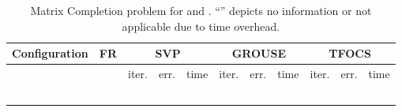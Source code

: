 \documentclass[twocolumn]{svjour3}
\begin{document}
\begin{table*}[!htp]
\caption{Matrix Completion problem for  and . ``'' depicts no information or not applicable due to time overhead.} {\label{table:2}}
\begin{center}
\begin{tabular}{|c|c|c|c|c|c|c|c|c|c|c|c|c|c|}
\multicolumn{4}{c|}{Configuration} & FR & \multicolumn{3}{|c|}{SVP} & \multicolumn{3}{|c|}{GROUSE} & \multicolumn{3}{|c}{TFOCS} \\
\hline \hline
\multicolumn{1}{c}{} & \multicolumn{1}{c}{} & \multicolumn{1}{c}{} & \multicolumn{1}{c|}{} & & 
\multicolumn{1}{|c}{\rm{iter.}} & \multicolumn{1}{c}{\rm{err.}} & \multicolumn{1}{c|}{\rm{time}} &
\multicolumn{1}{|c}{\rm{iter.}} & \multicolumn{1}{c}{\rm{err.}} & \multicolumn{1}{c|}{\rm{time}} &
\multicolumn{1}{|c}{\rm{iter.}} & \multicolumn{1}{c}{\rm{err.}} & \multicolumn{1}{c}{\rm{time}} \\
\hline\hline
\multicolumn{1}{c}{} & \multicolumn{1}{c}{} & \multicolumn{1}{c}{} & \multicolumn{1}{c|}{} &  & 
\multicolumn{1}{|c}{} & \multicolumn{1}{c}{} & \multicolumn{1}{c|}{} &
\multicolumn{1}{|c}{} & \multicolumn{1}{c}{} & \multicolumn{1}{c|}{} &
\multicolumn{1}{|c}{} & \multicolumn{1}{c}{} & \multicolumn{1}{c}{} \\
\hline
\multicolumn{1}{c}{} & \multicolumn{1}{c}{} & \multicolumn{1}{c}{} & \multicolumn{1}{c|}{} &  & 
\multicolumn{1}{|c}{} & \multicolumn{1}{c}{} & \multicolumn{1}{c|}{} &
\multicolumn{1}{|c}{} & \multicolumn{1}{c}{} & \multicolumn{1}{c|}{} &
\multicolumn{1}{|c}{} & \multicolumn{1}{c}{} & \multicolumn{1}{c}{} \\
\hline
\multicolumn{1}{c}{} & \multicolumn{1}{c}{} & \multicolumn{1}{c}{} & \multicolumn{1}{c|}{} &  & 
\multicolumn{1}{|c}{} & \multicolumn{1}{c}{} & \multicolumn{1}{c|}{} &
\multicolumn{1}{|c}{} & \multicolumn{1}{c}{} & \multicolumn{1}{c|}{} &
\multicolumn{1}{|c}{} & \multicolumn{1}{c}{} & \multicolumn{1}{c}{} \\
\hline
\multicolumn{1}{c}{} & \multicolumn{1}{c}{} & \multicolumn{1}{c}{} & \multicolumn{1}{c|}{} &  & 
\multicolumn{1}{|c}{} & \multicolumn{1}{c}{} & \multicolumn{1}{c|}{} &
\multicolumn{1}{|c}{} & \multicolumn{1}{c}{} & \multicolumn{1}{c|}{} &
\multicolumn{1}{|c}{} & \multicolumn{1}{c}{} & \multicolumn{1}{c}{} \\
\hline
\multicolumn{1}{c}{} & \multicolumn{1}{c}{} & \multicolumn{1}{c}{} & \multicolumn{1}{c|}{} &  & 
\multicolumn{1}{|c}{} & \multicolumn{1}{c}{} & \multicolumn{1}{c|}{} &
\multicolumn{1}{|c}{} & \multicolumn{1}{c}{} & \multicolumn{1}{c|}{} &

\end{tabular}
\end{center}
\end{table*}
\end{document}

